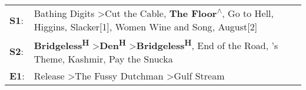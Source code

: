 \begin{supertabular}{p{0.03\textwidth}p{0.92\textwidth}}
 \textbf{S1}:  &  Bathing Digits\textsuperscript{} \textgreater \enspace Cut the Cable\textsuperscript{}, \enspace \textbf{The Floor\textsuperscript{$\wedge$}}, \enspace Go to Hell\textsuperscript{}, \enspace Higgins\textsuperscript{}, \enspace Slacker[1]\textsuperscript{}, \enspace Women Wine and Song\textsuperscript{}, \enspace August[2]\textsuperscript{}  \enspace  \\
 \textbf{S2}:  &                            \textbf{Bridgeless\textsuperscript{H}} \textgreater \enspace \textbf{Den\textsuperscript{H}} \textgreater \enspace \textbf{Bridgeless\textsuperscript{H}}, \enspace End of the Road\textsuperscript{}, 's Theme\textsuperscript{}, \enspace Kashmir\textsuperscript{}, \enspace Pay the Snucka\textsuperscript{}  \enspace  \\
 \textbf{E1}:  &                                                                                                                                                                                                               Release\textsuperscript{} \textgreater \enspace The Fussy Dutchman\textsuperscript{} \textgreater \enspace Gulf Stream\textsuperscript{}  \enspace  \\
\end{supertabular}
